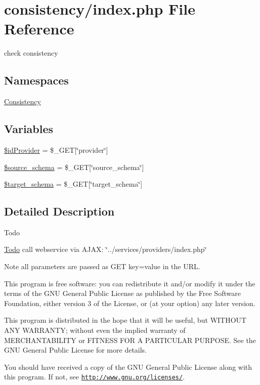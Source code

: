 \hypertarget{consistency_2index_8php}{}\section{consistency/index.php File Reference}
\label{consistency_2index_8php}


check consistency  


\subsection*{Namespaces}
\begin{DoxyCompactItemize}
\item 
 \hyperlink{namespace_consistency}{Consistency}
\end{DoxyCompactItemize}
\subsection*{Variables}
\begin{DoxyCompactItemize}
\item 
\hyperlink{namespace_consistency_a7c95ff52e91cdd46d783255e270c6d7f}{\$id\+Provider} = \$\+\_\+\+G\+ET\mbox{[}\char`\"{}provider\char`\"{}\mbox{]}
\item 
\hyperlink{namespace_consistency_ae760b4b690dd68b19e3624cdaddb5ad1}{\$source\+\_\+schema} = \$\+\_\+\+G\+ET\mbox{[}\char`\"{}source\+\_\+schema\char`\"{}\mbox{]}
\item 
\hyperlink{namespace_consistency_a43945d5f5c2b8601a121f40a2db7b5b2}{\$target\+\_\+schema} = \$\+\_\+\+G\+ET\mbox{[}\char`\"{}target\+\_\+schema\char`\"{}\mbox{]}
\end{DoxyCompactItemize}


\subsection{Detailed Description}
\begin{DoxyRefDesc}{Todo}
\item[\hyperlink{todo__todo000007}{Todo}]call webservice via A\+J\+AX\+: \char`\"{}../services/providers/index.\+php\char`\"{} \end{DoxyRefDesc}
\begin{DoxyNote}{Note}
all parameters are passed as G\+ET key=value in the U\+RL.
\end{DoxyNote}
This program is free software\+: you can redistribute it and/or modify it under the terms of the G\+NU General Public License as published by the Free Software Foundation, either version 3 of the License, or (at your option) any later version.

This program is distributed in the hope that it will be useful, but W\+I\+T\+H\+O\+UT A\+NY W\+A\+R\+R\+A\+N\+TY; without even the implied warranty of M\+E\+R\+C\+H\+A\+N\+T\+A\+B\+I\+L\+I\+TY or F\+I\+T\+N\+E\+SS F\+OR A P\+A\+R\+T\+I\+C\+U\+L\+AR P\+U\+R\+P\+O\+SE. See the G\+NU General Public License for more details.

You should have received a copy of the G\+NU General Public License along with this program. If not, see \href{http://www.gnu.org/licenses/}{\tt http\+://www.\+gnu.\+org/licenses/}. 